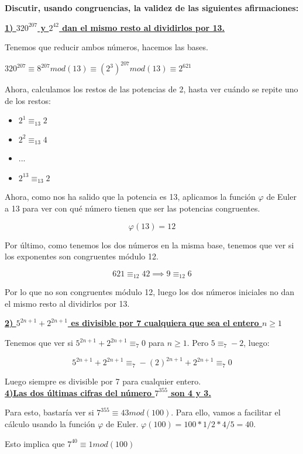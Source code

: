 \documentclass[11pt, a4paper, titlepage]{article}
\begin{document}
\textbf{ Discutir, usando congruencias, la validez de las siguientes afirmaciones:}

\underline{\textbf{1) $320^{207}$ y $2^{42}$ dan el mismo resto al dividirlos por 13.}}

Tenemos que reducir ambos números, hacemos las bases.

$320^{207}\equiv 8^{207}mod(13) \equiv (2^3)^{207} mod(13) \equiv 2^{621}$

Ahora, calculamos los restos de las potencias de 2, hasta ver cuándo se repite uno de los restos:

\begin{itemize}
	\item $2^1 \equiv_{13} 2$
	\item $2^2 \equiv_{13} 4$
	\item ...
	\item $2^{13} \equiv_{13} 2$
\end{itemize}

Ahora, como nos ha salido que la potencia es 13, aplicamos la función $\varphi$ de Euler a 13 para ver con qué número tienen que ser las potencias congruentes.

\[
\varphi(13) = 12
\]

Por último, como tenemos los dos números en la misma base, tenemos que ver si los exponentes son congruentes módulo 12.

\[
621 \equiv_{12} 42 \implies 9 \equiv_{12} 6
\]

Por lo que no son congruentes módulo 12, luego los dos números iniciales no dan el mismo resto al dividirlos por 13.

\textbf{\underline{2) $5^{2n+1} + 2^{2n+1}$ es divisible por 7 cualquiera que sea el entero $n \geq 1$}}

Tenemos que ver si $5^{2n+1} + 2^{2n+1} \equiv_7 0$ para $n\geq 1$. Pero $5\equiv_7 -2$, luego:

\[
5^{2n+1} + 2^{2n+1} \equiv_7 -(2)^{2n+1} + 2^{2n+1} \equiv_7 0
\]

Luego siempre es divisible por 7 para cualquier entero.\\


\underline{\textbf{4)Las dos últimas cifras del número $7^{355}$ son 4 y 3.}}

Para esto, bastaría ver si $7^{355} \equiv 43 mod(100)$. Para ello, vamos a facilitar el cálculo usando la función $\varphi$ de Euler. $\varphi(100) = 100*1/2 * 4/5 = 40$.

Esto implica que $ 7^{40} \equiv 1 mod(100)$
\end{document}
